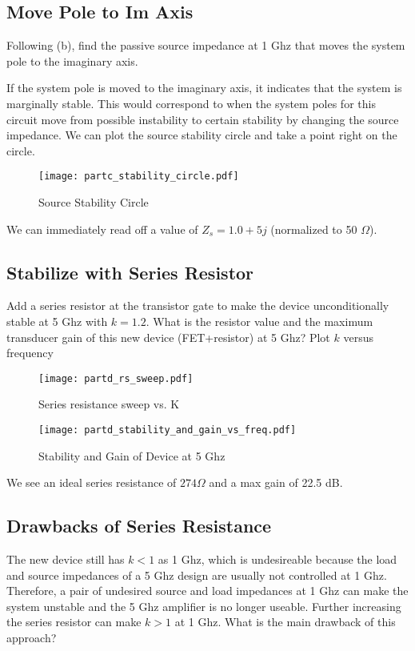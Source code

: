 \subsection{Move Pole to Im Axis}
{\color{blue} Following (b), find the passive source impedance at 1 Ghz that moves the system pole to the imaginary axis.}

If the system pole is moved to the imaginary axis, it indicates that the system is marginally stable.
This would correspond to when the system poles for this circuit move from possible instability to certain stability by changing the source impedance.
We can plot the source stability circle and take a point right on the circle.
\begin{figure}[H]
    \centering \texttt{[image: partc\_stability\_circle.pdf]}
    \caption{Source Stability Circle}
\end{figure}
We can immediately read off a value of $Z_s = 1.0 + 5j$ (normalized to 50 $\Omega$).

\subsection{Stabilize with Series Resistor}
{\color{blue} Add a series resistor at the transistor gate to make the device unconditionally stable at 5 Ghz with $k=1.2$.
What is the resistor value and the maximum transducer gain of this new device (FET+resistor) at 5 Ghz?
Plot $k$ versus frequency}

\begin{figure}[H]
    \texttt{[image: partd\_rs\_sweep.pdf]}
    \caption{Series resistance sweep vs. K}
    \endminipage\hfill
    \texttt{[image: partd\_stability\_and\_gain\_vs\_freq.pdf]}
    \caption{Stability and Gain of Device at 5 Ghz}
    \endminipage
\end{figure}

We see an ideal series resistance of $274 \Omega$ and a max gain of 22.5 dB.

\subsection{Drawbacks of Series Resistance}
{\color{blue} The new device still has $k < 1$ as 1 Ghz, which is undesireable because the load and source impedances of a 5 Ghz design are usually not controlled at 1 Ghz.
Therefore, a pair of undesired source and load impedances at 1 Ghz can make the system unstable and the 5 Ghz amplifier is no longer useable.
Further increasing the series resistor can make $k > 1$ at 1 Ghz.
What is the main drawback of this approach?}

